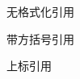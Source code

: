 \documentclass{ctexart}
\begin{document}
	无格式化引用\cite{biblatex}
	
	带方括号引用\parencite{mittelbach2004}
	
	上标引用\supercite{徐伟20177}
	
	\nocite{*}	%
	
	\printbibliography[title = 参考文献]	%
	
\end{document}
